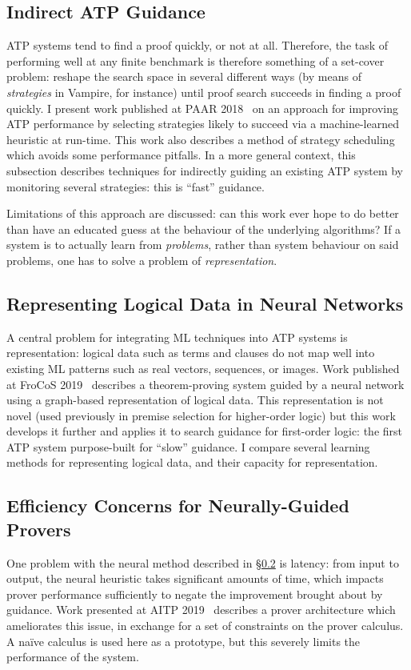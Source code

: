 \documentclass[a4paper]{article}
\begin{document}
\subsection{Indirect ATP Guidance}
ATP systems tend to find a proof quickly, or not at all.
Therefore, the task of performing well at any finite benchmark is therefore something of a set-cover problem: reshape the search space in several different ways (by means of \emph{strategies} in Vampire, for instance) until proof search succeeds in finding a proof quickly.
I present work published at PAAR 2018~\cite{paar2018} on an approach for improving ATP performance by selecting strategies likely to succeed via a machine-learned heuristic at run-time.
This work also describes a method of strategy scheduling which avoids some performance pitfalls.
In a more general context, this subsection describes techniques for indirectly guiding an existing ATP system by monitoring several strategies: this is ``fast'' guidance.

Limitations of this approach are discussed: can this work ever hope to do better than have an educated guess at the behaviour of the underlying algorithms?
If a system is to actually learn from \emph{problems}, rather than system behaviour on said problems, one has to solve a problem of \emph{representation}.

\subsection{Representing Logical Data in Neural Networks}
\label{sec:representation}
A central problem for integrating ML techniques into ATP systems is representation: logical data such as terms and clauses do not map well into existing ML patterns such as real vectors, sequences, or images.
Work published at FroCoS 2019~\cite{frocos2019} describes a theorem-proving system guided by a neural network using a graph-based representation of logical data.
This representation is not novel (used previously in premise selection for higher-order logic) but this work develops it further and applies it to search guidance for first-order logic: the first ATP system purpose-built for ``slow'' guidance.
I compare several learning methods for representing logical data, and their capacity for representation.

\subsection{Efficiency Concerns for Neurally-Guided Provers}
\label{sec:efficiency}
One problem with the neural method described in \S\ref{sec:representation} is latency: from input to output, the neural heuristic takes significant amounts of time, which impacts prover performance sufficiently to negate the improvement brought about by guidance.
Work presented at AITP 2019~\cite{aitp2019} describes a prover architecture which ameliorates this issue, in exchange for a set of constraints on the prover calculus.
A na\"ive calculus is used here as a prototype, but this severely limits the performance of the system.
\end{document}
